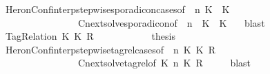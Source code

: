 \begin{isabellebody}
\ HeronConf{\isacharunderscore}interp{\isacharunderscore}stepwise{\isacharunderscore}sporadicon{\isacharunderscore}cases{\isacharbrackleft}of\ {\isacartoucheopen}{\isasymGamma}{\isacartoucheclose}\ {\isacartoucheopen}n{\isacartoucheclose}\ {\isacartoucheopen}K{}{\isacartoucheclose}\ {\isacartoucheopen}{\isasymtau}{\isacartoucheclose}\ {\isacartoucheopen}K{}{\isacartoucheclose}\ {\isacartoucheopen}{\isasymPsi}{\isacartoucheclose}\ {\isacartoucheopen}{\isasymPhi}{\isacartoucheclose}{\isacharbrackright}\isanewline
\ \ \ \ \ \ \ \ \ \ \ \ \ \ \ \ Cnext{\isacharunderscore}solve{\isacharunderscore}sporadicon{\isacharbrackleft}of\ {\isacartoucheopen}{\isasymGamma}{\isacartoucheclose}\ {\isacartoucheopen}n{\isacartoucheclose}\ {\isacartoucheopen}{\isasymPsi}{\isacartoucheclose}\ {\isacartoucheopen}K{}{\isacartoucheclose}\ {\isacartoucheopen}{\isasymtau}{\isacartoucheclose}\ {\isacartoucheopen}K{}{\isacartoucheclose}\ {\isacartoucheopen}{\isasymPhi}{\isacartoucheclose}{\isacharbrackright}\ \isamarkupfalse%
\ blast\isanewline
\ \ \ \ \ \ \isamarkupfalse%
\isanewline
\ \ \ \ \ \ \ \ \isamarkupfalse%
\ {\isacharparenleft}TagRelation\ K\ K\ R{\isacharparenright}\isanewline
\ \ \ \ \ \ \ \ \isamarkupfalse%
\ \isamarkupfalse%
\ {\isacharquery}thesis\isanewline
\ \ \ \ \ \ \ \ \ \ \isamarkupfalse%
\ HeronConf{\isacharunderscore}interp{\isacharunderscore}stepwise{\isacharunderscore}tagrel{\isacharunderscore}cases{\isacharbrackleft}of\ {\isacartoucheopen}{\isasymGamma}{\isacartoucheclose}\ {\isacartoucheopen}n{\isacartoucheclose}\ {\isacartoucheopen}K\ {\isacartoucheopen}K\ {\isacartoucheopen}R{\isacartoucheclose}\ {\isacartoucheopen}{\isasymPsi}{\isacartoucheclose}\ {\isacartoucheopen}{\isasymPhi}{\isacartoucheclose}{\isacharbrackright}\isanewline
\ \ \ \ \ \ \ \ \ \ \ \ \ \ \ \ Cnext{\isacharunderscore}solve{\isacharunderscore}tagrel{\isacharbrackleft}of\ {\isacartoucheopen}K\ {\isacartoucheopen}n{\isacartoucheclose}\ {\isacartoucheopen}K\ {\isacartoucheopen}R{\isacartoucheclose}\ {\isacartoucheopen}{\isasymGamma}{\isacartoucheclose}\ {\isacartoucheopen}{\isasymPsi}{\isacartoucheclose}\ {\isacartoucheopen}{\isasymPhi}{\isacartoucheclose}{\isacharbrackright}\ \isamarkupfalse%
\ blast\isanewline

\end{isabellebody}
